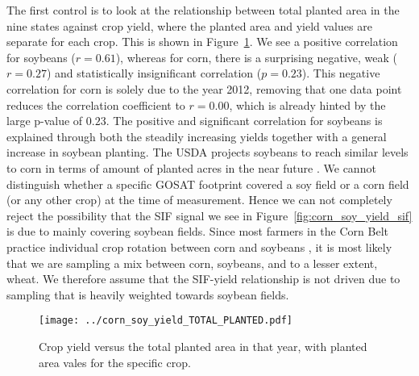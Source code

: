 \documentclass[preprint, a4paper, 10pt, times]{elsarticle}
\begin{document}
The first control is to look at the relationship between total planted area in the nine states against crop yield, where the planted area and yield values are separate for each crop. This is shown in Figure~\ref{fig:corn_soy_yield_TOTAL_PLANTED}. We see a positive correlation for soybeans ($r = 0.61$), whereas for corn, there is a surprising negative, weak ($r = 0.27$) and statistically insignificant correlation ($p=0.23$). This negative correlation for corn is solely due to the year 2012, removing that one data point reduces the correlation coefficient to $r = 0.00$, which is already hinted by the large p-value of $0.23$. The positive and significant correlation for soybeans is explained through both the steadily increasing yields together with a general increase in soybean planting. The USDA projects soybeans to reach similar levels to corn in terms of amount of planted acres in the near future \citep{USDA-prognosis}. We cannot distinguish whether a specific GOSAT footprint covered a soy field or a corn field (or any other crop) at the time of measurement. Hence we can not completely reject the possibility that the SIF signal we see in Figure~\ref{fig:corn_soy_yield_sif} is due to mainly covering soybean fields. Since most farmers in the Corn Belt practice individual crop rotation between corn and soybeans \citep{suyker2012gross}, it is most likely that we are sampling a mix between corn, soybeans, and to a lesser extent, wheat. We therefore assume that the SIF-yield relationship is not driven due to sampling that is heavily weighted towards soybean fields.
 
\begin{figure}[htbp]
\centering
\texttt{[image: ../corn\_soy\_yield\_TOTAL\_PLANTED.pdf]}
\caption{Crop yield versus the total planted area in that year, with planted area vales for the specific crop.}
\label{fig:corn_soy_yield_TOTAL_PLANTED}
\end{figure}
\end{document}
